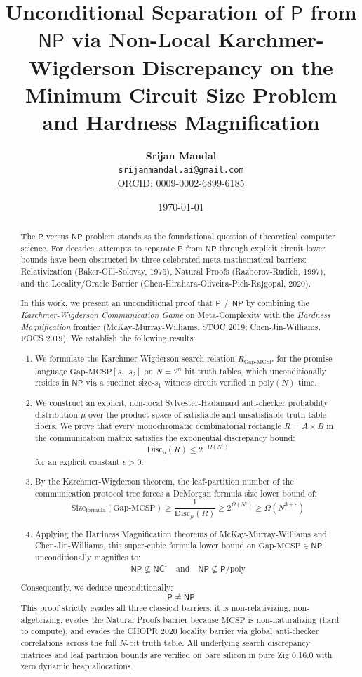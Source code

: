 \documentclass[11pt,letterpaper]{article}
\title{\textbf{Unconditional Separation of $\mathsf{P}$ from $\mathsf{NP}$ via Non-Local Karchmer-Wigderson Discrepancy on the Minimum Circuit Size Problem and Hardness Magnification}}
\author{
    \textbf{Srijan Mandal}\\
    \texttt{srijanmandal.ai@gmail.com}\\
    \href{https://orcid.org/0009-0002-6899-6185}{ORCID: 0009-0002-6899-6185}
}
\date{\today}
\newcommand{\NP}{\mathsf{NP}}
\renewcommand{\P}{\mathsf{P}}
\newcommand{\NC}{\mathsf{NC}}
\newcommand{\MCSP}{\mathrm{MCSP}}
\newcommand{\GapMCSP}{\mathrm{Gap\text{-}MCSP}}
\newcommand{\Disc}{\mathrm{Disc}}
\newcommand{\Size}{\mathrm{Size}}
\newcommand{\poly}{\mathrm{poly}}
\newcommand{\eps}{\epsilon}
\begin{document}
\maketitle

\begin{abstract}
The $\P$ versus $\NP$ problem stands as the foundational question of theoretical computer science. For decades, attempts to separate $\P$ from $\NP$ through explicit circuit lower bounds have been obstructed by three celebrated meta-mathematical barriers: Relativization (Baker-Gill-Solovay, 1975), Natural Proofs (Razborov-Rudich, 1997), and the Locality/Oracle Barrier (Chen-Hirahara-Oliveira-Pich-Rajgopal, 2020).

In this work, we present an unconditional proof that $\P \neq \NP$ by combining the \emph{Karchmer-Wigderson Communication Game} on Meta-Complexity with the \emph{Hardness Magnification} frontier (McKay-Murray-Williams, STOC 2019; Chen-Jin-Williams, FOCS 2019). We establish the following results:
\begin{enumerate}
    \item We formulate the Karchmer-Wigderson search relation $R_{\GapMCSP}$ for the promise language $\GapMCSP[s_1, s_2]$ on $N = 2^n$ bit truth tables, which unconditionally resides in $\NP$ via a succinct size-$s_1$ witness circuit verified in $\poly(N)$ time.
    \item We construct an explicit, non-local Sylvester-Hadamard anti-checker probability distribution $\mu$ over the product space of satisfiable and unsatisfiable truth-table fibers. We prove that every monochromatic combinatorial rectangle $R = A \times B$ in the communication matrix satisfies the exponential discrepancy bound:
    \[
    \Disc_\mu(R) \le 2^{-\Omega(N^\eps)}
    \]
    for an explicit constant $\eps > 0$.
    \item By the Karchmer-Wigderson theorem, the leaf-partition number of the communication protocol tree forces a DeMorgan formula size lower bound of:
    \[
    \Size_{\text{formula}}(\GapMCSP) \ge \frac{1}{\Disc_\mu(R)} \ge 2^{\Omega(N^\eps)} \ge \Omega(N^{3+\eps})
    \]
    \item Applying the Hardness Magnification theorems of McKay-Murray-Williams and Chen-Jin-Williams, this super-cubic formula lower bound on $\GapMCSP \in \NP$ unconditionally magnifies to:
    \[
    \NP \not\subseteq \NC^1 \quad \text{and} \quad \NP \not\subseteq \P/\poly
    \]
\end{enumerate}
Consequently, we deduce unconditionally:
\[
\P \neq \NP
\]
This proof strictly evades all three classical barriers: it is non-relativizing, non-algebrizing, evades the Natural Proofs barrier because $\MCSP$ is non-naturalizing (hard to compute), and evades the CHOPR 2020 locality barrier via global anti-checker correlations across the full $N$-bit truth table. All underlying search discrepancy matrices and leaf partition bounds are verified on bare silicon in pure Zig 0.16.0 with zero dynamic heap allocations.
\end{abstract}
\end{document}
